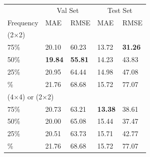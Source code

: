 \begin{tabular}{lllll}
\toprule
  & \multicolumn{2}{c}{Val Set} & \multicolumn{2}{c}{Test Set} \\
 Frequency & MAE & RMSE & MAE & RMSE
 \\
 \midrule
 \multicolumn{5}{l}{(2$\times$2)} \\
75\% & 20.10 & 60.23 & 13.72 & \textbf{31.26} \\
50\% & \textbf{19.84}  & \textbf{55.81} & 14.23  & 43.83 \\
25\% & 20.95 & 64.44 & 14.98 & 47.08 \\
\; 0\% & 21.76 & 68.68 & 15.72 & 77.07 \\
\multicolumn{5}{l}{(4$\times$4) or (2$\times$2)} \\
75\% & 20.73 & 63.21 & \textbf{13.38} & 38.61\\
50\% & 20.00 & 65.08 & 15.44 & 37.47 \\
25\% & 20.51 & 63.73 & 15.71 & 42.77\\
\; 0\% & 21.76 & 68.68 & 15.72 & 77.07\\
\bottomrule
\end{tabular}

 



